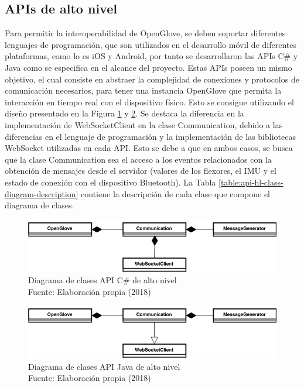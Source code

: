 \subsection{APIs de alto nivel}
\label{subseccion-estructura-apis-hl}
Para permitir la interoperabilidad de OpenGlove, se deben soportar diferentes lenguajes de programación, que son utilizados en el desarrollo móvil de diferentes plataformas, como lo es iOS y Android, por tanto se desarrollaron las APIs C\# y Java como se especifica en el alcance del proyecto. Estas APIs poseen un mismo objetivo, el cual consiste en abstraer la complejidad de conexiones y protocolos de comunicación necesarios, para tener una instancia OpenGlove que permita la interacción en tiempo real con el dispositivo físico. Esto se consigue utilizando el diseño presentado en la Figura \ref{fig:api-csharp-hl} y \ref{fig:api-java-hl}. Se destaca la diferencia en la implementación de WebSocketClient en la clase Communication, debido a las diferencias en el lenguaje de programación y la implementación de las bibliotecas WebSocket utilizadas en cada API. Esto se debe a que en ambos casos, se busca que la clase Communication sea el acceso a los eventos relacionados con la obtención de mensajes desde el servidor (valores de los flexores, el IMU y el estado de conexión con el dispositivo Bluetooth). La Tabla \ref{table:api-hl-class-diagram-description} contiene la descripción de cada clase que compone el diagrama de clases.


\begin{figure}[H]
  \begin{center} 
   	\includegraphics[width=1.0\textwidth]{images/chapter04/OpenGlove-Architecture-API-CSharp-HL.png} 
    \caption[Diagrama de clases API C\# de alto nivel]{Diagrama de clases API C\# de alto nivel \\Fuente: Elaboración propia (2018)}
    \label{fig:api-csharp-hl}
  \end{center}
\end{figure}

\begin{figure}[H]
  \begin{center} 
   	\includegraphics[width=1.0\textwidth]{images/chapter04/OpenGlove-Architecture-API-Java-HL.png} 
    \caption[Diagrama de clases API Java de alto nivel]{Diagrama de clases API Java de alto nivel \\Fuente: Elaboración propia (2018)}
    \label{fig:api-java-hl}
  \end{center}
\end{figure}

